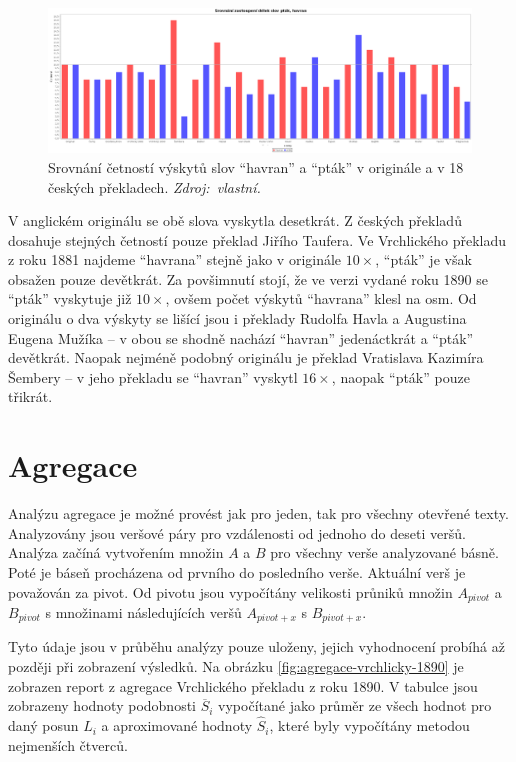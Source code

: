 \documentclass[dp.tex]{subfiles}
\begin{document}
\begin{figure}[h!]
	\centering
	\includegraphics[max width=\textwidth,keepaspectratio=true]{imgs-70-prakticka/cetnost-slov-orig}
	\caption[Srovnání četností výskytů slov \enquote{havran} a \enquote{pták} v originále a v 18 českých překladech.]{Srovnání četností výskytů slov \enquote{havran} a \enquote{pták} v originále a v 18 českých překladech. \textit{Zdroj:~vlastní.}}
	\label{fig:word-freq-compare}
\end{figure}

V anglickém originálu se obě slova vyskytla desetkrát. Z českých překladů dosahuje stejných četností pouze překlad Jiřího Taufera. Ve Vrchlického překladu z roku 1881 najdeme \enquote{havrana} stejně jako v originále $10\times$, \enquote{pták} je však obsažen pouze devětkrát. Za povšimnutí stojí, že ve verzi vydané roku 1890 se \enquote{pták} vyskytuje již $10\times$, ovšem počet výskytů \enquote{havrana} klesl na osm. Od originálu o dva výskyty se lišící jsou i překlady Rudolfa Havla a Augustina Eugena Mužíka -- v obou se shodně nachází \enquote{havran} jedenáctkrát a \enquote{pták} devětkrát. Naopak nejméně podobný originálu je překlad Vratislava Kazimíra Šembery -- v jeho překladu se \enquote{havran} vyskytl $16\times$, naopak \enquote{pták} pouze třikrát.

\section{Agregace}

Analýzu agregace je možné provést jak pro jeden, tak pro všechny otevřené texty. Analyzovány jsou veršové páry pro vzdálenosti od jednoho do deseti veršů. Analýza začíná vytvořením množin $A$ a $B$ pro všechny verše analyzované básně. Poté je báseň procházena od prvního do posledního verše. Aktuální verš je považován za pivot. Od pivotu jsou vypočítány velikosti průniků množin $A_{pivot}$ a $B_{pivot}$ s množinami následujících veršů $A_{pivot + x}$  s $B_{pivot + x}$. 

Tyto údaje jsou v průběhu analýzy pouze uloženy, jejich vyhodnocení 
probíhá až později při zobrazení výsledků. Na obrázku \ref{fig:agregace-vrchlicky-1890} je zobrazen report z agregace Vrchlického překladu z roku 1890. V tabulce jsou zobrazeny hodnoty podobnosti $\overline{S}_i$ vypočítané jako průměr ze všech hodnot pro daný posun $L_i$ a aproximované hodnoty $\hat{S}_i$, které byly vypočítány metodou nejmenších čtverců.
\end{document}
